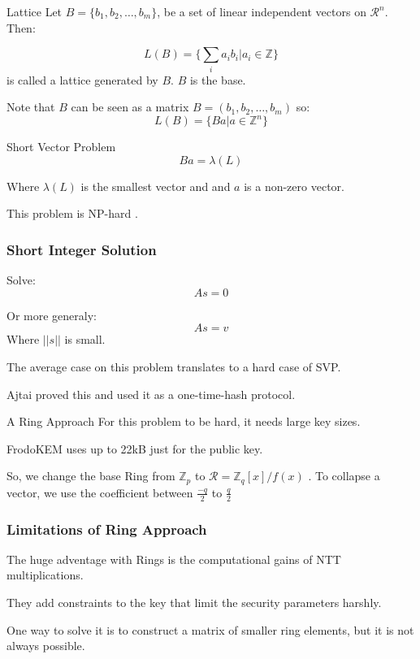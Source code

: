 \documentclass[presentation]{beamer}
\begin{document}
\begin{frame}[label=lattice]{Lattice}
  Let \(B = \{b_1, b_2, \dots, b_m\}\), be a set of linear
  independent
  vectors on \(\mathcal R ^ n\). Then:

  \[
    L(B) = \{\sum_i a_i b_i | a_i \in \mathbb Z \}
  \]
  is called a lattice generated by \(B\). \(B\) is the base.

  Note that \(B\) can be seen as a matrix \(B = (b_1, b_2,
  \dots, b_m)\)
  so:
  \[
    L(B) = \{Ba | a \in \mathbb Z^{n} \}
  \]
\end{frame}
\begin{frame}[label=short-vector-problem]{Short Vector Problem}
  \[
    Ba = \lambda(L)
  \]

  Where \(\lambda (L)\) is the smallest vector and and \(a\)
  is a non-zero
  vector.

  This problem is NP-hard \cite{original-ajtai}.
\end{frame}
\begin{frame}[label=short-integer-solution]
  \frametitle{Short Integer Solution}
  Solve:
  \[
    As = 0
  \]

  Or more generaly:
  \[
    As = v
  \]
  Where \(||s||\) is small.

  The average case on this problem translates to a hard case
  of SVP.

  Ajtai proved this and used it as a one-time-hash protocol.
\end{frame}
\begin{frame}[label=a-ring-approach]{A Ring Approach}
  For this problem to be hard, it needs large key sizes.

  FrodoKEM \cite{FrodoKEM} uses up to 22kB just for the public key.

  So, we change the base Ring from \(\mathbb Z_p\) to
  \(\mathcal R = \mathbb Z_q[x] / f(x)\) \cite{ring-sis, ring-lwe-1,ring-lwe-2}.
  \pause
  To collapse a vector, we use the coefficient between 
  $\frac{-q}{2}$ to $\frac{q}{2}$
\end{frame}
\begin{frame}[label=limitations-of-ring-approach]
  \frametitle{Limitations of Ring Approach}
  The huge adventage with Rings is the computational gains of NTT
  multiplications.

  They add constraints to the key that limit the security
  parameters harshly.

  One way to solve it is to construct a matrix of smaller ring
  elements, but it is not always possible.

\end{frame}
\end{document}
